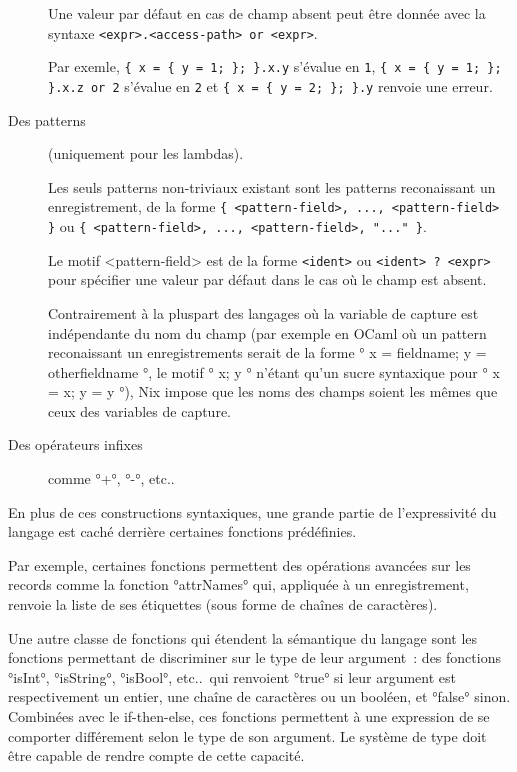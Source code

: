 \begin{description}
    Une valeur par défaut en cas de champ absent peut être donnée avec la
    syntaxe \lstinline{<expr>.<access-path> or <expr>}.

    Par exemle, \lstinline|{ x = { y = 1; }; }.x.y| s'évalue en \lstinline{1},
    \lstinline|{ x = { y = 1; }; }.x.z or 2| s'évalue en \lstinline{2} et
    \lstinline|{ x = { y = 2; }; }.y| renvoie une erreur.

  \item[Des patterns] (uniquement pour les lambdas).

    Les seuls patterns non-triviaux existant sont les patterns reconaissant un
    enregistrement, de la forme
    \lstinline|{ <pattern-field>, ..., <pattern-field> }| %
    ou
    \lstinline|{ <pattern-field>, ..., <pattern-field>, "..." }|. %

    Le motif <pattern-field> est de la forme \lstinline{<ident>} ou
    \lstinline{<ident> ? <expr>} pour spécifier une valeur par défaut dans le
    cas où le champ est absent.

    Contrairement à la pluspart des langages où la variable de capture est
    indépendante du nom du champ (par exemple en OCaml où un pattern
    reconaissant un enregistrements serait de la forme
    °{ x = fieldname; y = otherfieldname }°, le motif °{ x; y }° n'étant qu'un
    sucre syntaxique pour °{ x = x; y = y }°), Nix impose que les noms des
    champs soient les mêmes que ceux des variables de capture.

  \item[Des opérateurs infixes] comme °+°, °-°, etc..

\end{description}

En plus de ces constructions syntaxiques, une grande partie de l'expressivité
du langage est caché derrière certaines fonctions prédéfinies.

Par exemple, certaines fonctions permettent des opérations avancées sur les
records comme la fonction °attrNames° qui, appliquée à un
enregistrement, renvoie la liste de ses étiquettes (sous forme de chaînes de
caractères).

Une autre classe de fonctions qui étendent la sémantique du langage sont les
fonctions permettant de discriminer sur le type de leur argument : des
fonctions °isInt°, °isString°, °isBool°, etc..\ qui renvoient °true° si leur
argument est respectivement un entier, une chaîne de caractères ou un booléen,
et °false° sinon.
Combinées avec le if-then-else, ces fonctions permettent à une expression de se
comporter différement selon le type de son argument. Le système de type doit
être capable de rendre compte de cette capacité.

